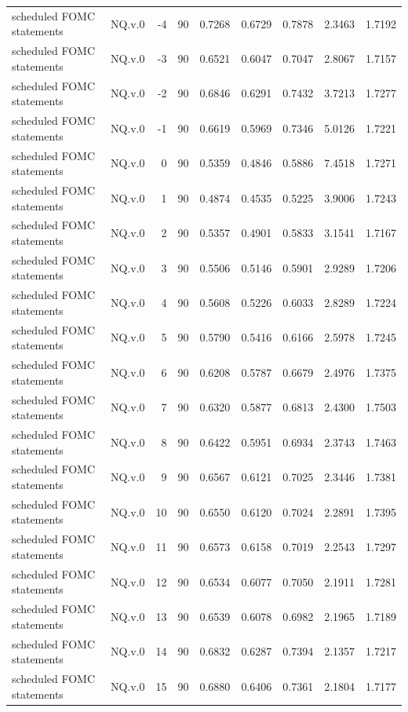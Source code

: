 \begin{tabular}{llrrrrrrr}
scheduled FOMC statements & NQ.v.0 & -4 & 90 & 0.7268 & 0.6729 & 0.7878 & 2.3463 & 1.7192 \\
scheduled FOMC statements & NQ.v.0 & -3 & 90 & 0.6521 & 0.6047 & 0.7047 & 2.8067 & 1.7157 \\
scheduled FOMC statements & NQ.v.0 & -2 & 90 & 0.6846 & 0.6291 & 0.7432 & 3.7213 & 1.7277 \\
scheduled FOMC statements & NQ.v.0 & -1 & 90 & 0.6619 & 0.5969 & 0.7346 & 5.0126 & 1.7221 \\
scheduled FOMC statements & NQ.v.0 & 0 & 90 & 0.5359 & 0.4846 & 0.5886 & 7.4518 & 1.7271 \\
scheduled FOMC statements & NQ.v.0 & 1 & 90 & 0.4874 & 0.4535 & 0.5225 & 3.9006 & 1.7243 \\
scheduled FOMC statements & NQ.v.0 & 2 & 90 & 0.5357 & 0.4901 & 0.5833 & 3.1541 & 1.7167 \\
scheduled FOMC statements & NQ.v.0 & 3 & 90 & 0.5506 & 0.5146 & 0.5901 & 2.9289 & 1.7206 \\
scheduled FOMC statements & NQ.v.0 & 4 & 90 & 0.5608 & 0.5226 & 0.6033 & 2.8289 & 1.7224 \\
scheduled FOMC statements & NQ.v.0 & 5 & 90 & 0.5790 & 0.5416 & 0.6166 & 2.5978 & 1.7245 \\
scheduled FOMC statements & NQ.v.0 & 6 & 90 & 0.6208 & 0.5787 & 0.6679 & 2.4976 & 1.7375 \\
scheduled FOMC statements & NQ.v.0 & 7 & 90 & 0.6320 & 0.5877 & 0.6813 & 2.4300 & 1.7503 \\
scheduled FOMC statements & NQ.v.0 & 8 & 90 & 0.6422 & 0.5951 & 0.6934 & 2.3743 & 1.7463 \\
scheduled FOMC statements & NQ.v.0 & 9 & 90 & 0.6567 & 0.6121 & 0.7025 & 2.3446 & 1.7381 \\
scheduled FOMC statements & NQ.v.0 & 10 & 90 & 0.6550 & 0.6120 & 0.7024 & 2.2891 & 1.7395 \\
scheduled FOMC statements & NQ.v.0 & 11 & 90 & 0.6573 & 0.6158 & 0.7019 & 2.2543 & 1.7297 \\
scheduled FOMC statements & NQ.v.0 & 12 & 90 & 0.6534 & 0.6077 & 0.7050 & 2.1911 & 1.7281 \\
scheduled FOMC statements & NQ.v.0 & 13 & 90 & 0.6539 & 0.6078 & 0.6982 & 2.1965 & 1.7189 \\
scheduled FOMC statements & NQ.v.0 & 14 & 90 & 0.6832 & 0.6287 & 0.7394 & 2.1357 & 1.7217 \\
scheduled FOMC statements & NQ.v.0 & 15 & 90 & 0.6880 & 0.6406 & 0.7361 & 2.1804 & 1.7177 \\

\end{tabular}
